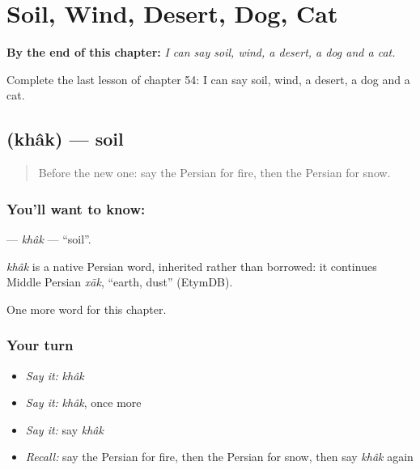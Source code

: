
\chapter{Soil, Wind, Desert, Dog, Cat}
\label{ch:fa-soil-wind-desert-dog-cat}

\begin{chapteropening}
\textbf{By the end of this chapter:} \emph{I can say soil, wind, a desert, a dog and a cat.}

Complete the last lesson of chapter 54: I can say soil, wind, a desert, a dog and a cat.
\end{chapteropening}

\section[\texorpdfstring{\fa{خاک} (khâk)}{خاک (khâk)}]{ (khâk) — soil}

\label{lesson:FA-C54-khak}



\begin{quote}
Before the new one: say the Persian for fire, then the Persian for snow.
\end{quote}

\subsection*{You'll want to know: }
\textbf{} — \emph{khâk} — \textquotedblleft{}soil\textquotedblright{}.

\begin{cousinweb}
\emph{khâk} is a native Persian word, inherited rather than borrowed: it continues Middle Persian \emph{xāk}, \textquotedblleft{}earth, dust\textquotedblright{} (EtymDB).
\end{cousinweb}

\begin{grammarlens}[title={What you've built}]
One more word for this chapter.
\end{grammarlens}

\subsection*{Your turn}
\begin{itemize}
\raggedright
  \item \emph{Say it:} \emph{khâk}
  \item \emph{Say it:} \emph{khâk}, once more
  \item \emph{Say it:} say \emph{khâk}
  \item \emph{Recall:} say the Persian for fire, then the Persian for snow, then say \emph{khâk} again
\end{itemize}

